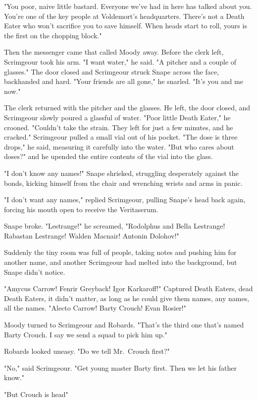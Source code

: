 "You poor, naive little bastard. Everyone we've had in here has talked about you. You're one of the key people at Voldemort's headquarters. There's not a Death Eater who won't sacrifice you to save himself. When heads start to roll, yours is the first on the chopping block."

Then the messenger came that called Moody away. Before the clerk left, Scrimgeour took his arm. "I want water," he said. "A pitcher and a couple of glasses." The door closed and Scrimgeour struck Snape across the face, backhanded and hard. "Your friends are all gone," he snarled. "It's you and me now."

The clerk returned with the pitcher and the glasses. He left, the door closed, and Scrimgeour slowly poured a glassful of water. "Poor little Death Eater," he crooned. "Couldn't take the strain. They left for just a few minutes, and he cracked." Scrimgeour pulled a small vial out of his pocket. "The dose is three drops," he said, measuring it carefully into the water. "But who cares about doses?" and he upended the entire contents of the vial into the glass.

"I don't know any names!" Snape shrieked, struggling desperately against the bonds, kicking himself from the chair and wrenching wrists and arms in panic.

"I don't want any names," replied Scrimgeour, pulling Snape's head back again, forcing his mouth open to receive the Veritaserum.

Snape broke. "Lestrange!" he screamed, "Rodolphus and Bella Lestrange! Rabastan Lestrange! Walden Macnair! Antonin Dolohov!"

Suddenly the tiny room was full of people, taking notes and pushing him for another name, and another{\el} Scrimgeour had melted into the background, but Snape didn't notice.

"Amycus Carrow! Fenrir Greyback! Igor Karkaroff!" Captured Death Eaters, dead Death Eaters, it didn't matter, as long as he could give them names, any names, all the names. "Alecto Carrow! Barty Crouch! Evan Rosier!"

Moody turned to Scrimgeour and Robards. "That's the third one that's named Barty Crouch. I say we send a squad to pick him up."

Robards looked uneasy. "Do we tell Mr.~Crouch first?"

"No," said Scrimgeour. "Get young master Barty first. Then we let his father know."

"But Crouch is head{\el}"

